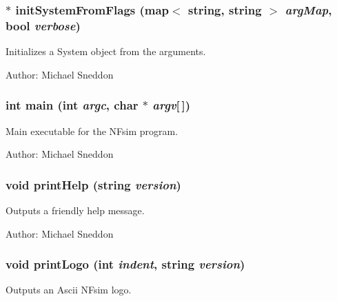 \subsubsection{ $\ast$ initSystemFromFlags (map$<$ string, string $>$ {\em argMap}, bool {\em verbose})}\label{NFsim_8cpp_ba72a46366f8d33295a853f07c43a288}


Initializes a System object from the arguments. 

\begin{Desc}
\item[Author:]Michael Sneddon \end{Desc}
\subsubsection{\setlength{\rightskip}{0pt plus 5cm}int main (int {\em argc}, char $\ast$ {\em argv}[$\,$])}\label{NFsim_8cpp_0ddf1224851353fc92bfbff6f499fa97}


Main executable for the NFsim program. 

\begin{Desc}
\item[Author:]Michael Sneddon \end{Desc}
\subsubsection{\setlength{\rightskip}{0pt plus 5cm}void printHelp (string {\em version})}\label{NFsim_8cpp_e16641224ad0a169d8db2dbcec348157}


Outputs a friendly help message. 

\begin{Desc}
\item[Author:]Michael Sneddon \end{Desc}
\subsubsection{\setlength{\rightskip}{0pt plus 5cm}void printLogo (int {\em indent}, string {\em version})}\label{NFsim_8cpp_74763fe62871a5e5e685b885c63d30a4}


Outputs an Ascii NFsim logo. 

